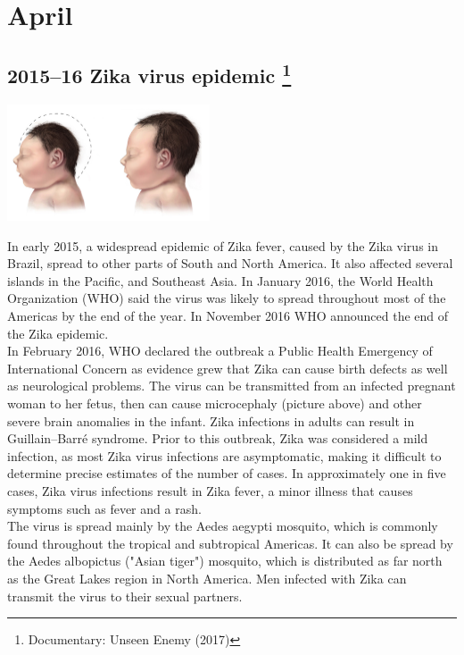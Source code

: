 \documentclass[11pt]{report}
\begin{document}
\section{April}
\subsection{2015–16 Zika virus epidemic \protect\footnote{Documentary: Unseen Enemy (2017)}}
\vspace{2mm}\begin{center}\includegraphics[width=6cm]{./img/zika.jpg}\end{center}
In early 2015, a widespread epidemic of Zika fever, caused by the Zika virus in Brazil, spread to other parts of South and North America. It also affected several islands in the Pacific, and Southeast Asia. In January 2016, the World Health Organization (WHO) said the virus was likely to spread throughout most of the Americas by the end of the year. In November 2016 WHO announced the end of the Zika epidemic.\\ \indent In February 2016, WHO declared the outbreak a Public Health Emergency of International Concern as evidence grew that Zika can cause birth defects as well as neurological problems. The virus can be transmitted from an infected pregnant woman to her fetus, then can cause microcephaly (picture above) and other severe brain anomalies in the infant. Zika infections in adults can result in Guillain–Barré syndrome. Prior to this outbreak, Zika was considered a mild infection, as most Zika virus infections are asymptomatic, making it difficult to determine precise estimates of the number of cases. In approximately one in five cases, Zika virus infections result in Zika fever, a minor illness that causes symptoms such as fever and a rash.\\
\indent The virus is spread mainly by the Aedes aegypti mosquito, which is commonly found throughout the tropical and subtropical Americas. It can also be spread by the Aedes albopictus ("Asian tiger") mosquito, which is distributed as far north as the Great Lakes region in North America. Men infected with Zika can transmit the virus to their sexual partners.
\end{document}
